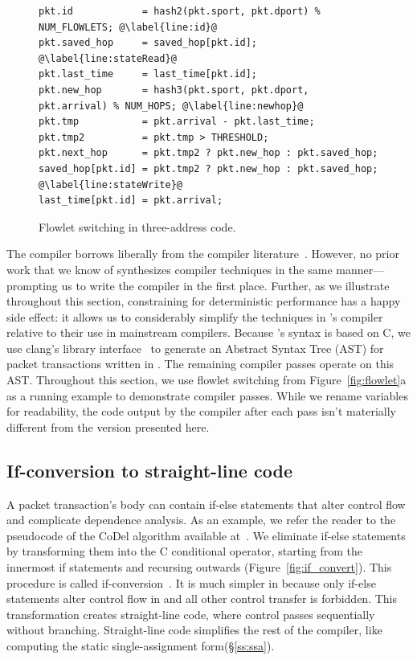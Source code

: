 \begin{figure}[!t]
\begin{lstlisting}[style=customc]
pkt.id            = hash2(pkt.sport, pkt.dport) % NUM_FLOWLETS; @\label{line:id}@
pkt.saved_hop     = saved_hop[pkt.id]; @\label{line:stateRead}@
pkt.last_time     = last_time[pkt.id];
pkt.new_hop       = hash3(pkt.sport, pkt.dport, pkt.arrival) % NUM_HOPS; @\label{line:newhop}@
pkt.tmp           = pkt.arrival - pkt.last_time;
pkt.tmp2          = pkt.tmp > THRESHOLD;
pkt.next_hop      = pkt.tmp2 ? pkt.new_hop : pkt.saved_hop;
saved_hop[pkt.id] = pkt.tmp2 ? pkt.new_hop : pkt.saved_hop; @\label{line:stateWrite}@
last_time[pkt.id] = pkt.arrival;
\end{lstlisting}
\caption{Flowlet switching in three-address code.\protect\footnotemark}
\label{fig:three_address}
\end{figure}

The \pktlanguage compiler borrows liberally from the compiler
literature~\cite{muchnik}. However, no prior work that we know of synthesizes
compiler techniques in the same manner---prompting us to write the \pktlanguage
compiler in the first place. Further, as we illustrate throughout this section,
constraining \pktlanguage for deterministic performance has a happy side
effect: it allows us to considerably simplify the techniques in \pktlanguage's
compiler relative to their use in mainstream compilers. Because \pktlanguage's
syntax is based on C, we use clang's library interface~\cite{libclang} to
generate an Abstract Syntax Tree (AST) for packet transactions written in
\pktlanguage. The remaining compiler passes operate on this AST. Throughout
this section, we use flowlet switching from Figure~\ref{fig:flowlet}a as a
running example to demonstrate compiler passes. While we rename variables for
readability, the code output by the \pktlanguage compiler after each pass isn't
materially different from the version presented here.

\subsection{If-conversion to straight-line code}
A packet transaction's body can contain if-else statements that alter control
flow and complicate dependence analysis. As an example, we refer the reader to
the pseudocode of the CoDel algorithm available at~\cite{codel_code}. We
eliminate if-else statements by transforming them into the C conditional
operator, starting from the innermost if statements and recursing outwards
(Figure~\ref{fig:if_convert}). This procedure is called
if-conversion~\cite{if_conversion}. It is much simpler in \pktlanguage because
only if-else statements alter control flow in \pktlanguage and all other control
transfer is forbidden.  This transformation creates
straight-line code, where control passes sequentially without branching.
Straight-line code simplifies the rest of the compiler, like computing the
static single-assignment form(\S\ref{ss:ssa}).


